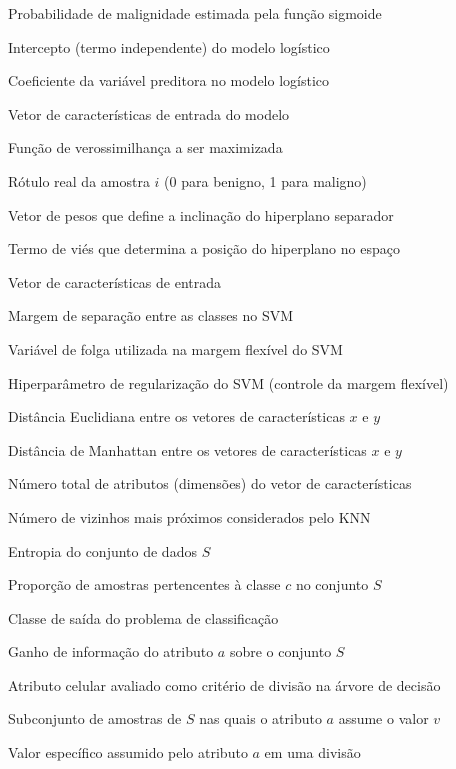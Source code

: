 \documentclass[
    12pt
    ,oneside
    ,a4paper
    ,chapter=TITLE
    ,section=TITLE
    ,sumario=abnt-6027-2012
    ,english,brazil]{abntex2} %
\begin{document}
\begin{simbolos}
  \item[$p(x)$] Probabilidade de malignidade estimada pela função sigmoide
  \item[$\beta_0$] Intercepto (termo independente) do modelo logístico
  \item[$\beta_1$] Coeficiente da variável preditora no modelo logístico
  \item[$x_1$] Vetor de características de entrada do modelo
  \item[$L(\beta_0, \beta_1)$] Função de verossimilhança a ser maximizada
  \item[$y_i$] Rótulo real da amostra $i$ (0 para benigno, 1 para maligno)

  \item[$w$] Vetor de pesos que define a inclinação do hiperplano separador
  \item[$b$] Termo de viés que determina a posição do hiperplano no espaço
  \item[$x$] Vetor de características de entrada
  \item[$\gamma$] Margem de separação entre as classes no SVM
  \item[$\xi$] Variável de folga utilizada na margem flexível do SVM
  \item[$C$] Hiperparâmetro de regularização do SVM (controle da margem flexível)

  \item[$d_E(x, y)$] Distância Euclidiana entre os vetores de características $x$ e $y$
  \item[$d_M(x, y)$] Distância de Manhattan entre os vetores de características $x$ e $y$
  \item[$n$] Número total de atributos (dimensões) do vetor de características
  \item[$k$] Número de vizinhos mais próximos considerados pelo KNN

  \item[$H(S)$] Entropia do conjunto de dados $S$
  \item[$p(c)$] Proporção de amostras pertencentes à classe $c$ no conjunto $S$
  \item[$c$] Classe de saída do problema de classificação
  \item[$IG(S, a)$] Ganho de informação do atributo $a$ sobre o conjunto $S$
  \item[$a$] Atributo celular avaliado como critério de divisão na árvore de decisão
  \item[$S_v$] Subconjunto de amostras de $S$ nas quais o atributo $a$ assume o valor $v$
  \item[$v$] Valor específico assumido pelo atributo $a$ em uma divisão


\end{simbolos}
\end{document}
